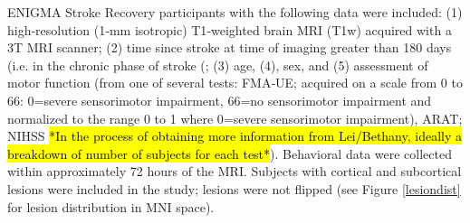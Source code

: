 \documentclass[10pt]{article}
\begin{document}
ENIGMA Stroke Recovery participants with the following data were included: (1) high‐resolution (1‐mm isotropic) T1‐weighted brain MRI (T1w) acquired with a 3T MRI scanner; (2) time since stroke at time of imaging greater than 180 days (i.e. in the chronic phase of stroke (\cite{Bernhardt2017-av}; (3) age, (4), sex, and (5) assessment of motor function (from one of several tests: FMA‐UE; acquired on a scale from 0 to 66: 0=severe sensorimotor impairment, 66=no sensorimotor impairment and normalized to the range 0 to 1 where 0=severe sensorimotor impairment), ARAT; NIHSS \hl{*In the process of obtaining more information from Lei/Bethany, ideally a breakdown of number of subjects for each test*}). Behavioral data were collected within approximately 72 hours of the MRI. Subjects with cortical and subcortical lesions were included in the study; lesions were not flipped (see Figure \ref{lesiondist} for lesion distribution in MNI space). 
\end{document}
